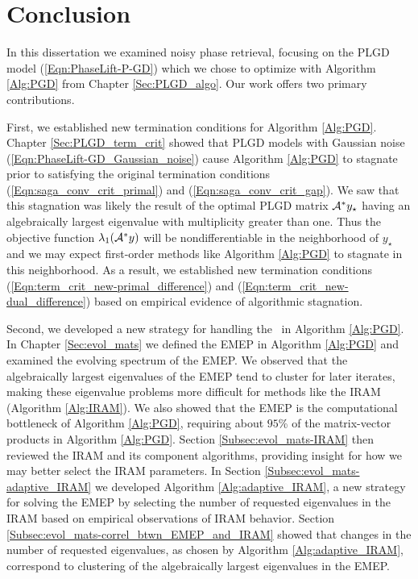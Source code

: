 \chapter{Conclusion}			\label{Sec:Conclusion}


In this dissertation we examined noisy phase retrieval, focusing on the PLGD model (\ref{Eqn:PhaseLift-P-GD}) which we chose to optimize with Algorithm \ref{Alg:PGD} from Chapter \ref{Sec:PLGD_algo}.
Our work offers two primary contributions.


First, we established new termination conditions for Algorithm \ref{Alg:PGD}.
Chapter \ref{Sec:PLGD_term_crit} showed that PLGD models with Gaussian noise (\ref{Eqn:PhaseLift-GD_Gaussian_noise}) cause Algorithm \ref{Alg:PGD} to stagnate prior to satisfying the original termination conditions (\ref{Eqn:saga_conv_crit_primal}) and (\ref{Eqn:saga_conv_crit_gap}).  
We saw that this stagnation was likely the result of the optimal PLGD matrix ${\mathcal A}^*y_\star$ having an algebraically largest eigenvalue with multiplicity greater than one.
Thus the objective function $\lambda_1({\mathcal A}^*y)$ will be nondifferentiable in the neighborhood of $y_\star$ and we may expect first-order methods like Algorithm \ref{Alg:PGD} to stagnate in this neighborhood.
As a result, we established new termination conditions (\ref{Eqn:term_crit_new-primal_difference}) and (\ref{Eqn:term_crit_new-dual_difference}) based on empirical evidence of algorithmic stagnation.


Second, we developed a new strategy for handling the \emep \ in Algorithm \ref{Alg:PGD}.
In Chapter \ref{Sec:evol_mats} we defined the EMEP in Algorithm \ref{Alg:PGD} and examined the evolving spectrum of the EMEP.
We observed that the algebraically largest eigenvalues of the EMEP tend to cluster for later iterates, making these eigenvalue problems more difficult for methods like the IRAM (Algorithm \ref{Alg:IRAM}).
We also showed that the EMEP is the computational bottleneck of Algorithm \ref{Alg:PGD}, requiring about $95$\% of the matrix-vector products in Algorithm \ref{Alg:PGD}.
Section \ref{Subsec:evol_mats-IRAM} then reviewed the IRAM and its component algorithms, providing insight for how we may better select the IRAM parameters.
In Section \ref{Subsec:evol_mats-adaptive_IRAM} we developed Algorithm \ref{Alg:adaptive_IRAM}, a new strategy for solving the EMEP by selecting the number of requested eigenvalues in the IRAM based on empirical observations of IRAM behavior.
Section \ref{Subsec:evol_mats-correl_btwn_EMEP_and_IRAM} showed that changes in the number of requested eigenvalues, as chosen by Algorithm \ref{Alg:adaptive_IRAM}, correspond to clustering of the algebraically largest eigenvalues in the EMEP.


